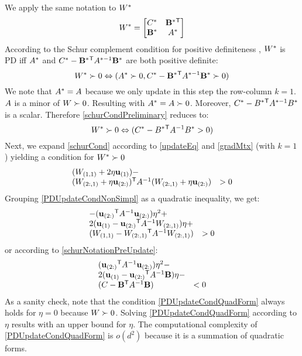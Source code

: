 \documentclass{article}
\begin{document}
We apply the same notation to ${{W^*}}$
\begin{equation}
{{{W^*}}}= \left[ \begin{matrix} C^* & \mathbf{B^*}{}^\mathsf{T} \\ \mathbf{B^*} & {A^*} \end{matrix} \right]
\end{equation}
According to the Schur complement condition for positive definiteness , ${{W^*}}$ is PD iff ${A}^*$ and $C^* - \mathbf{B}^*{}^\mathsf{T} {A}^{*-1} \mathbf{B}^*$ are both positive definite:
\begin{equation}
{{W^*}} \succ  0 \Leftrightarrow ({A}^* \succ  0, C^* - \mathbf{B}^*{}^\mathsf{T} {A}^{*-1} \mathbf{B}^* \succ  0)
\label{schurCondPreliminary}
\end{equation}
We note that ${A}^* = {A}$ because we only update in this step the row-column $k=1$. ${A}$ is a minor of ${W} \succ  0$. Resulting with ${A}^*={A} \succ  0$. Moreover, $C^* - B^*{}^\mathsf{T} A^{*-1} B^*$ is a scalar. Therefore \eqref{schurCondPreliminary} reduces to:
\begin{equation}
{W^*} \succ  0 \Leftrightarrow (C^* - B^*{}^\mathsf{T} A^{-1} B^* >  0)
\label{schurCond}
\end{equation}
Next, we expand \eqref{schurCond} according to \eqref{updateEq} and \eqref{gradMtx} (with $k=1$) yielding a condition for ${{W^*}} \succ  0$
\begin{equation}
\begin{array}{lcl} 
({W}_{(1,1)} + 2\eta \mathbf{u}_{(1)})  - \\
({W}_{(2:,1)} + \eta \mathbf{u}_{(2:)}){}^\mathsf{T} {A}^{-1} ({W}_{(2:,1)} + \eta \mathbf{u}_{(2:)})  & > 0
\end{array}
\label{PDUpdateCondNonSimpl}
\end{equation}
Grouping \eqref{PDUpdateCondNonSimpl} as a quadratic inequality, we get:
\begin{equation}
\begin{array}{lcl} 
-(\mathbf{u}_{(2:)}{}^\mathsf{T} {A}^{-1} \mathbf{u}_{(2:)})\eta^2  + \\
2(\mathbf{u}_{(1)} - \mathbf{u}_{(2:)}{}^\mathsf{T} {A}^{-1}{W}_{(2:,1)})\eta + \\
({W}_{(1,1)} - {W}_{(2:,1)}{}^\mathsf{T}  {A}^{-1} {W}_{(2:,1)}) & > 0
\end{array}
\label{PDUpdateCondQuadFormWithW}
\end{equation}
or according to \eqref{schurNotationPreUpdate}:
\begin{equation}
\begin{array}{lcl} 
(\mathbf{u}_{(2:)}{}^\mathsf{T} {A}^{-1} \mathbf{u}_{(2:)}) \eta^2 - \\
2(\mathbf{u}_{(1)} - \mathbf{u}_{(2:)}{}^\mathsf{T} {A}^{-1}\mathbf{B})\eta - \\
(C - \mathbf{B}{}^\mathsf{T}  {A}^{-1} \mathbf{B}) & < 0
\end{array}
\label{PDUpdateCondQuadForm}
\end{equation}
As a sanity check, note that the condition \eqref{PDUpdateCondQuadForm} always holds for $\eta = 0$ because ${W}\succ0$. Solving \eqref{PDUpdateCondQuadForm} according to $\eta$ results with an upper bound for $\eta$.  The computational complexity of \eqref{PDUpdateCondQuadForm} is $o(d^2)$ because it is a summation of quadratic forms. 
\end{document}
